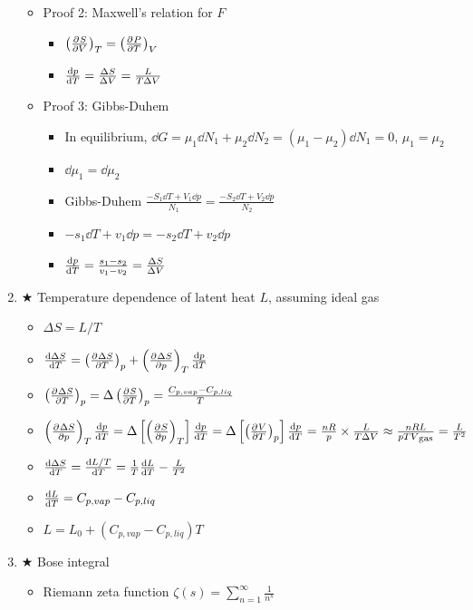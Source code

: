 \documentclass{article}
\theoremstyle{remark}
\newcommand{\myref}[1]{\hyperref[back:#1]{$\bigstar$}\label{#1}}
\newcommand{\s}[1]{\textsubscript{#1}}
\newcommand{\ppdv}[4][]{\left(\pdv[#1]{#2}{#3}\right)_{#4}}
\begin{document}
\begin{enumerate}
\begin{itemize}
            \item Proof 2: Maxwell's relation for $F$\begin{itemize}
                \item $\ppdv{S}{V}{T}=\ppdv{P}{T}{V}$
                \item $\dv{p}{T}=\frac{\Delta S}{\Delta V}=\frac{L}{T\Delta V}$
            \end{itemize}
            \item Proof 3: Gibbs-Duhem\begin{itemize}
                \item In equilibrium, $\dd G=\mu_1\dd N_1+\mu_2\dd N_2=(\mu_1-\mu_2)\dd N_1=0$, $\mu_1=\mu_2$
                \item $\dd\mu_1=\dd\mu_2$
                \item Gibbs-Duhem $\frac{-S_1\dd T+V_1\dd p}{N_1}=\frac{-S_2\dd T+V_2\dd p}{N_2}$
                \item $-s_1\dd T+v_1\dd p=-s_2\dd T+v_2\dd p$
                \item $\dv{p}{T}=\frac{s_1-s_2}{v_1-v_2}=\frac{\Delta S}{\Delta V}$
            \end{itemize}
        \end{itemize}
    \item \myref{temp_dep_latent_heat} Temperature dependence of latent heat $L$, assuming ideal gas\begin{itemize}
            \item $\Delta S=L/T$
            \item $\dv{\Delta S}{T}=\ppdv{\Delta S}{T}{p}+\ppdv{\Delta S}{p}{T}\dv{p}{T}$
            \item $\ppdv{\Delta S}{T}{p}=\Delta\ppdv{S}{T}{p}=\frac{C_{p,vap}-C_{p,liq}}{T}$
            \item $\ppdv{\Delta S}{p}{T}\dv{p}{T}=\Delta\left[\ppdv{S}{p}{T}\right]\dv{p}{T}=\Delta\left[\ppdv{V}{T}{p}\right]\dv{p}{T}=\frac{nR}{p}\times\frac{L}{T\Delta V}\approx\frac{nRL}{pTV\s{gas}}=\frac{L}{T^2}$
            \item $\dv{\Delta S}{T}=\dv{L/T}{T}=\frac{1}{T}\dv{L}{T}-\frac{L}{T^2}$
            \item $\dv{L}{T}=C_{p,vap}-C_{p,liq}$
            \item $L = L_0+(C_{p,vap}-C_{p,liq})T$
        \end{itemize}
    \item \myref{bose_integral} Bose integral\begin{itemize}
            \item Riemann zeta function $\zeta(s)=\sum_{n=1}^\infty\frac{1}{n^s}$

\end{itemize}
\end{enumerate}
\end{document}
